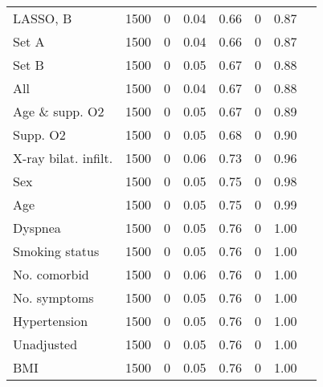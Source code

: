 \documentclass{article}
\begin{document}
{\begin{longtable}{lccccccc}
LASSO, B & 1500 & 0 & 0.04 & 0.66 & 0 & 0.87\\
Set A & 1500 & 0 & 0.04 & 0.66 & 0 & 0.87\\
Set B & 1500 & 0 & 0.05 & 0.67 & 0 & 0.88\\
All & 1500 & 0 & 0.04 & 0.67 & 0 & 0.88\\
Age \& supp. O2 & 1500 & 0 & 0.05 & 0.67 & 0 & 0.89\\
Supp. O2 & 1500 & 0 & 0.05 & 0.68 & 0 & 0.90\\
X-ray bilat. infilt. & 1500 & 0 & 0.06 & 0.73 & 0 & 0.96\\
Sex & 1500 & 0 & 0.05 & 0.75 & 0 & 0.98\\
Age & 1500 & 0 & 0.05 & 0.75 & 0 & 0.99\\
Dyspnea & 1500 & 0 & 0.05 & 0.76 & 0 & 1.00\\
Smoking status & 1500 & 0 & 0.05 & 0.76 & 0 & 1.00\\
No. comorbid & 1500 & 0 & 0.06 & 0.76 & 0 & 1.00\\
No. symptoms & 1500 & 0 & 0.05 & 0.76 & 0 & 1.00\\
Hypertension & 1500 & 0 & 0.05 & 0.76 & 0 & 1.00\\
Unadjusted & 1500 & 0 & 0.05 & 0.76 & 0 & 1.00\\
BMI & 1500 & 0 & 0.05 & 0.76 & 0 & 1.00\\
\bottomrule
\hline
\end{longtable}
}

\clearpage
\end{document}
